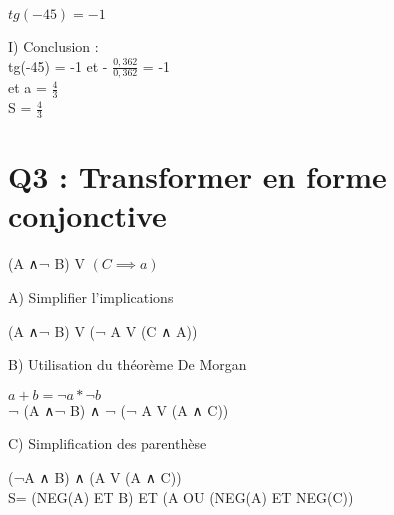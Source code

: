 $
tg(-45) = -1
$

\vspace{10mm} %

I) Conclusion : \\

tg(-45) = -1 et - $\frac{0,362}{0,362}$ = -1 \\

et a = $\frac{4}{3}$\\

S = $\frac{4}{3}$\\


\newpage

\vspace{10mm} %

\section{Q3 : Transformer en forme conjonctive}

\vspace{4mm} %

(A ∧¬ B) V $(C\implies a)$ \\

\begin{flushleft}
A) Simplifier l’implications \\
\end{flushleft}

  (A ∧¬ B) V (¬ A V (C ∧ A))\\

\begin{flushleft}
B) Utilisation du théorème De Morgan \\
\end{flushleft}

  $a+b = ¬ a * ¬ b$\\

  ¬ (A ∧¬ B) ∧ ¬ (¬ A V (A ∧ C)) \\

\begin{flushleft}
C) Simplification des parenthèse \\
\end{flushleft}

  (¬A ∧ B) ∧ (A V (A ∧ C)) \\

  S= (NEG(A) ET B) ET (A OU (NEG(A) ET NEG(C)) \\


\vspace{10mm} %


